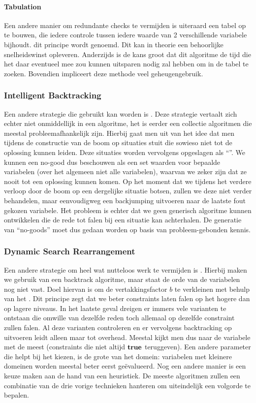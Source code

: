 \paragraph{Tabulation}
Een andere manier om redundante checks te vermijden is uiteraard een tabel op te bouwen, die iedere controle tussen iedere waarde van 2 verschillende variabele bijhoudt. dit principe wordt  genoemd. Dit kan in theorie een behoorlijke snelheidswinst opleveren. Anderzijds is de kans groot dat dit algoritme de tijd die het daar eventueel mee zou kunnen uitsparen nodig zal hebben om in de tabel te zoeken. Bovendien impliceert deze methode veel geheugengebruik.
\subsubsection{Intelligent Backtracking}
Een andere strategie die gebruikt kan worden is . Deze strategie vertaalt zich echter niet onmiddellijk in een algoritme, het is eerder een collectie algoritmen die meestal probleemafhankelijk zijn. Hierbij gaat men uit van het idee dat men tijdens de constructie van de boom op situaties stuit die sowieso niet tot de oplossing kunnen leiden. Deze situaties worden vervolgens opgeslagen als ``''. We kunnen een no-good dus beschouwen als een set waarden voor bepaalde variabelen (over het algemeen niet alle variabelen), waarvan we zeker zijn dat ze nooit tot een oplossing kunnen komen. Op het moment dat we tijdens het verdere verloop door de boom op een dergelijke situatie botsen, zullen we deze niet verder behandelen, maar eenvoudigweg een backjumping uitvoeren naar de laatste fout gekozen variabele. Het probleem is echter dat we geen generisch algoritme kunnen ontwikkelen die de rede tot falen bij een situatie kan achterhalen. De generatie van ``no-goods'' moet dus gedaan worden op basis van probleem-gebonden kennis.
\subsubsection{Dynamic Search Rearrangement}
\label{sss:dynamicSearchRearrangement}
Een andere strategie om heel wat nutteloos werk te vermijden is . Hierbij maken we gebruik van een backtrack algoritme, maar staat de orde van de variabelen nog niet vast. Doel hiervan is om de vertakkingsfactor $b$ te verkleinen met behulp van het . Dit principe zegt dat we beter constraints laten falen op het hogere dan op lagere niveaus. In het laatste geval dreigen er immers vele varianten te ontstaan die omwille van dezelfde reden toch allemaal op dezelfde constraint zullen falen. Al deze varianten controleren en er vervolgens backtracking op uitvoeren leidt alleen maar tot overhead. Meestal kijkt men dus naar de variabele met de meest  (constraints die niet altijd $\mbox{\bf true}$ teruggeven). Een andere parameter die helpt bij het kiezen, is de grote van het domein: variabelen met kleinere domeinen worden meestal beter eerst ge\"evalueerd. Nog een andere manier is een keuze maken aan de hand van een heuristiek. De meeste algoritmen zullen een combinatie van de drie vorige technieken hanteren om uiteindelijk een volgorde te bepalen.
